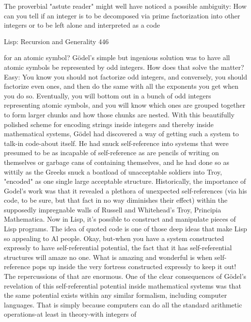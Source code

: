        The proverbial "astute reader" might well have noticed a possible ambiguity:
How can you tell if an integer is to be decomposed via prime factorization into other
integers or to be left alone and interpreted as a code




Lisp: Recursion and Generality                                                         446

for an atomic symbol? Gödel’s simple but ingenious solution was to have all atomic
symbols be represented by odd integers. How does that solve the matter? Easy: You
know you should not factorize odd integers, and conversely, you should factorize
even ones, and then do the same with all the exponents you get when you do so.
Eventually, you will bottom out in a bunch of odd integers representing atomic
symbols, and you will know which ones are grouped together to form larger chunks
and how those chunks are nested.
        With this beautifully polished scheme for encoding strings inside integers and
thereby inside mathematical systems, Gödel had discovered a way of getting such a
system to talk-in code-about itself. He had snuck self-reference into systems that were
presumed to be as incapable of self-reference as are pencils of writing on themselves
or garbage cans of containing themselves, and he had done so as wittily as the Greeks
snuck a boatload of unacceptable soldiers into Troy, "encoded" as one single large
acceptable structure.
        Historically, the importance of Godel's work was that it revealed a plethora of
unexpected self-references (via his code, to be sure, but that fact in no way diminishes
their effect) within the supposedly impregnable walls of Russell and Whitehead's
Troy, Principia Mathematica. Now in Lisp, it's possible to construct and manipulate
pieces of Lisp programs. The idea of quoted code is one of those deep ideas that make
Lisp so appealing to Al people. Okay, but-when you have a system constructed
expressly to have self-referential potential, the fact that it has self-referential
structures will amaze no one. What is amazing and wonderful is when self-reference
pops up inside the very fortress constructed expressly to keep it out! The
repercussions of that are enormous.
        One of the clear consequences of Gödel’s revelation of this self-referential
potential inside mathematical systems was that the same potential exists within any
similar formalism, including computer languages. That is simply because computers
can do all the standard arithmetic operations-at least in theory-with integers of
